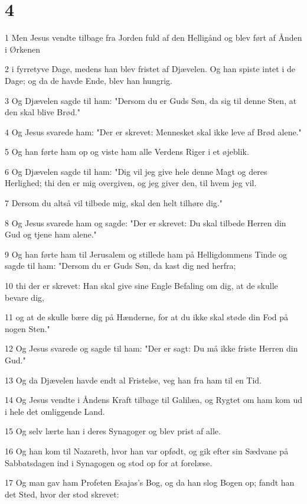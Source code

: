 \chapter{4}

\par 1 Men Jesus vendte tilbage fra Jorden fuld af den Helligånd og blev ført af Ånden i Ørkenen
\par 2 i fyrretyve Dage, medens han blev fristet af Djævelen. Og han spiste intet i de Dage; og da de havde Ende, blev han hungrig.
\par 3 Og Djævelen sagde til ham: "Dersom du er Guds Søn, da sig til denne Sten, at den skal blive Brød."
\par 4 Og Jesus svarede ham: "Der er skrevet: Mennesket skal ikke leve af Brød alene."
\par 5 Og han førte ham op og viste ham alle Verdens Riger i et øjeblik.
\par 6 Og Djævelen sagde til ham: "Dig vil jeg give hele denne Magt og deres Herlighed; thi den er mig overgiven, og jeg giver den, til hvem jeg vil.
\par 7 Dersom du altså vil tilbede mig, skal den helt tilhøre dig."
\par 8 Og Jesus svarede ham og sagde: "Der er skrevet: Du skal tilbede Herren din Gud og tjene ham alene."
\par 9 Og han førte ham til Jerusalem og stillede ham på Helligdommens Tinde og sagde til ham: "Dersom du er Guds Søn, da kast dig ned herfra;
\par 10 thi der er skrevet: Han skal give sine Engle Befaling om dig, at de skulle bevare dig,
\par 11 og at de skulle bære dig på Hænderne, for at du ikke skal støde din Fod på nogen Sten."
\par 12 Og Jesus svarede og sagde til ham: "Der er sagt: Du må ikke friste Herren din Gud."
\par 13 Og da Djævelen havde endt al Fristelse, veg han fra ham til en Tid.
\par 14 Og Jesus vendte i Åndens Kraft tilbage til Galilæa, og Rygtet om ham kom ud i hele det omliggende Land.
\par 15 Og selv lærte han i deres Synagoger og blev prist af alle.
\par 16 Og han kom til Nazareth, hvor han var opfødt, og gik efter sin Sædvane på Sabbatsdagen ind i Synagogen og stod op for at forelæse.
\par 17 Og man gav ham Profeten Esajas's Bog, og da han slog Bogen op; fandt han det Sted, hvor der stod skrevet:
